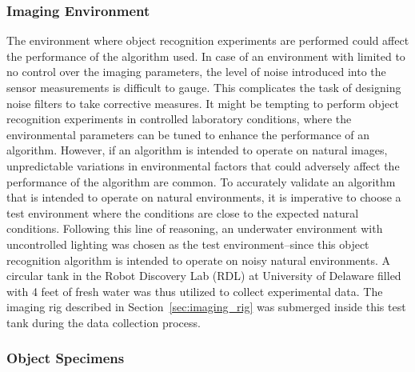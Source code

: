 \subsubsection{Imaging Environment}


The environment where object recognition experiments are performed could affect the performance of the algorithm used. In case of an environment with limited to no control over the imaging parameters, the level of noise introduced into the sensor measurements is difficult to gauge. This complicates the task of designing noise filters to take corrective measures. It might be tempting to perform object recognition experiments in controlled laboratory conditions, where the environmental parameters can be tuned to enhance the performance of an algorithm. However, if an algorithm is intended to operate on natural images, unpredictable variations in environmental factors that could adversely affect the performance of the algorithm are common. To accurately validate an algorithm that is intended to operate on natural environments, it is imperative to choose a 
test environment where the conditions are close to the expected natural conditions. Following this line of reasoning, an underwater environment with uncontrolled lighting was chosen as the test environment--since this object recognition algorithm is intended to operate on noisy natural environments. A circular tank in the Robot Discovery Lab (RDL) at University of Delaware filled with 4 feet of fresh water was thus utilized to collect experimental data. The imaging rig described in Section~\ref{sec:imaging_rig} was submerged inside this test tank during the data collection process.

\subsubsection{Object Specimens}


